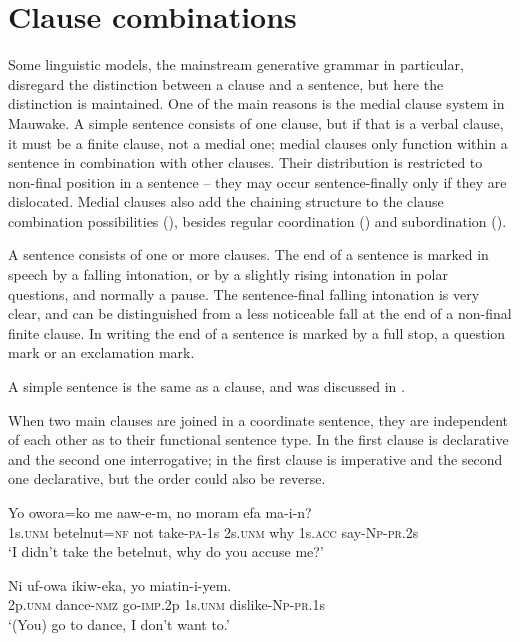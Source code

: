 
\chapter{Clause combinations} \label{chap:8}

Some linguistic models, the mainstream generative grammar in particular, disregard the distinction between a clause and a sentence, but here the distinction is maintained. One of the main reasons is the medial clause system in Mauwake.  A simple sentence consists of one clause, but if that is a verbal clause, it must be a finite clause, not a medial one; medial clauses only function within a sentence in combination with other clauses. Their distribution is restricted to non-final position in a sentence -- they may occur sentence-finally only if they are dislocated. Medial clauses also add the chaining structure to the clause combination possibilities (), besides regular coordination () and subordination (). 

A sentence consists of one or more clauses. The end of a sentence is marked in speech by a falling intonation, or by a slightly rising intonation in polar questions, and normally a pause. The sentence-final falling intonation is very clear, and can be distinguished from a less noticeable fall at the end of a non-final finite clause. In writing the end of a sentence is marked by a full stop, a question mark or an exclamation mark.

A simple sentence is the same as a clause, and was discussed in .

When two main clauses are joined in a coordinate sentence, they are independent of each other as to their functional sentence type. In  the first clause is declarative and the second one interrogative; in  the first clause is imperative and the second one declarative, but the order could also be reverse. 

\ea%
\label{ex:8:x1352}
\gll Yo  owora=ko  me  aaw-e-m,  no  moram  efa ma-i-n?\\
1s.\textsc{unm}  betelnut=\textsc{nf}  not  take-\textsc{pa}-1s  2s.\textsc{unm}  why  1s.\textsc{acc} say-\textsc{Np}-\textsc{pr}.2s\\
\glt `I didn't take the betelnut, why do you accuse me?'
\z


\ea%
\label{ex:8:x1358}
\gll Ni  uf-owa  ikiw-eka,  yo  miatin-i-yem. \\
2p.\textsc{unm}  dance-\textsc{nmz}  go-\textsc{imp}.2p  1s.\textsc{unm}  dislike-\textsc{Np}-\textsc{pr}.1s\\
\glt `(You) go to dance, I don't want to.'
\z


